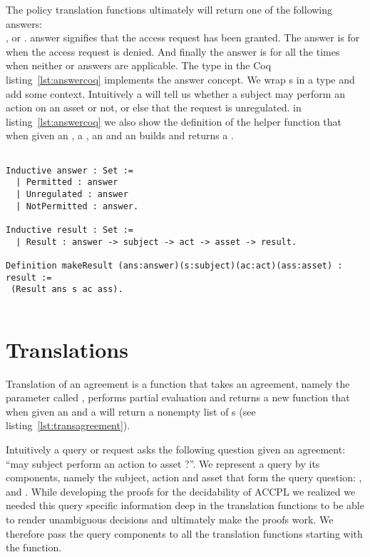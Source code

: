 The policy translation functions ultimately will return one of the following answers: \\,  or .  answer signifies that the access request has been granted. The  answer is for when the access request is denied. And finally the  answer is for all the times when neither  or  answers are applicable. The  type in the Coq listing~\ref{lst:answercoq} implements the answer concept. We wrap s in a  type and add some context. Intuitively a  will tell us whether a subject may perform an action on an asset or not, or else that the request is unregulated. in listing~\ref{lst:answercoq} we also show the definition of the helper function  that when given an , a , an  and an  builds and returns a .


\begin{minipage}[c]{0.95\textwidth}
\begin{lstlisting}

Inductive answer : Set :=
  | Permitted : answer
  | Unregulated : answer
  | NotPermitted : answer.
  
Inductive result : Set :=
  | Result : answer -> subject -> act -> asset -> result.
 
Definition makeResult (ans:answer)(s:subject)(ac:act)(ass:asset) : result := 
 (Result ans s ac ass).
 
\end{lstlisting}
\end{minipage}

\section{Translations}\label{sec:translationfuncs}

Translation of an agreement is a function that takes an agreement, namely the parameter called , performs partial evaluation and returns a new function that when given an  and a  will return a nonempty list of s (see listing~\ref{lst:transagreement}). 

Intuitively a query or request asks the following question given an agreement: ``may subject  perform an action  to asset ?''. We represent a query by its components, namely the subject, action and asset that form the query question: ,  and . While developing the proofs for the decidability of \ac{ACCPL} we realized we needed this query specific information deep in the translation functions to be able to render unambiguous decisions and ultimately make the proofs work. We therefore pass the query components to all the translation functions starting with the  function. 

